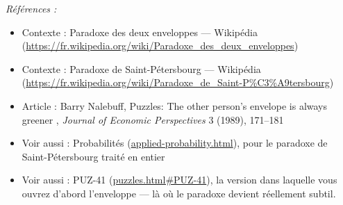 \documentclass[11pt]{article}
\newenvironment{refs}{\par\small\noindent\emph{Références :}\begin{itemize}\setlength\itemsep{0pt}}{\end{itemize}\normalsize}
\begin{document}
\begin{refs}
\item Contexte : Paradoxe des deux enveloppes --- Wikipédia (\url{https://fr.wikipedia.org/wiki/Paradoxe_des_deux_enveloppes})
\item Contexte : Paradoxe de Saint-Pétersbourg --- Wikipédia (\url{https://fr.wikipedia.org/wiki/Paradoxe_de_Saint-P%C3%A9tersbourg})
\item Article : Barry Nalebuff, \og{} Puzzles: The other person's envelope is always greener \fg{}, \textit{Journal of Economic Perspectives} 3 (1989), 171--181
\item Voir aussi : Probabilités (\url{applied-probability.html}), pour le paradoxe de Saint-Pétersbourg traité en entier
\item Voir aussi : PUZ-41 (\url{puzzles.html#PUZ-41}), la version dans laquelle vous ouvrez d'abord l'enveloppe --- là où le paradoxe devient réellement subtil.
\end{refs}

\bigskip
\end{document}
